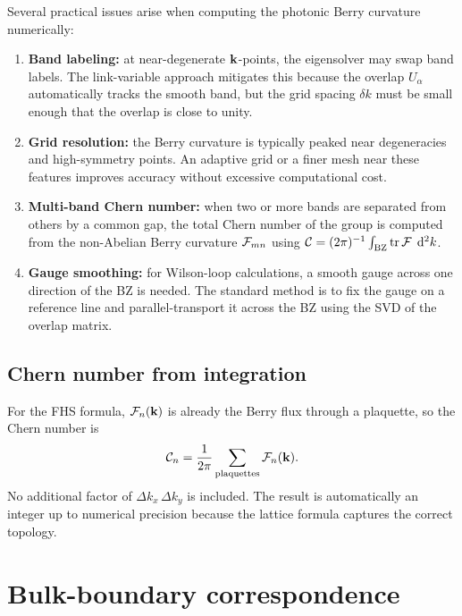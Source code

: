 Several practical issues arise when computing the photonic Berry
curvature numerically:
\begin{enumerate}
 \item \textbf{Band labeling:} at near-degenerate $\mathbf{k}$-points, the
 eigensolver may swap band labels. The link-variable approach
 mitigates this because the overlap $U_\alpha$ automatically tracks
 the smooth band, but the grid spacing $\delta k$ must be small
 enough that the overlap is close to unity.
 \item \textbf{Grid resolution:} the Berry curvature is typically
 peaked near degeneracies and high-symmetry points. An adaptive
 grid or a finer mesh near these features improves accuracy without
 excessive computational cost.
 \item \textbf{Multi-band Chern number:} when two or more bands are
 separated from others by a common gap, the total Chern number of
 the group is computed from the non-Abelian Berry curvature
 $\mathcal{F}_{mn}$ using
 $\mathcal{C} = (2\pi)^{-1}\int_{\mathrm{BZ}}\operatorname{tr}\mathcal{F}\;\mathop{}\!\mathrm{d}^2 k$.
 \item \textbf{Gauge smoothing:} for Wilson-loop calculations, a
 smooth gauge across one direction of the BZ is needed. The
 standard method is to fix the gauge on a reference line and
 parallel-transport it across the BZ using the SVD of the overlap
 matrix.
\end{enumerate}

\subsection{Chern number from integration}
\label{ssec:chern-numerical}

For the FHS formula, $\mathcal{F}_n(\mathbf{k})$ is already the Berry flux through a
plaquette, so the Chern number is
\begin{equation}
 \mathcal{C}_n = \frac{1}{2\pi}\sum_{\text{plaquettes}}\mathcal{F}_n(\mathbf{k}).
 \label{eq:fhs-chern-sum}
\end{equation}
No additional factor of $\Delta k_x\,\Delta k_y$ is included. The result
is automatically an integer up to numerical precision because the
lattice formula captures the correct topology.


\section{Bulk-boundary correspondence}
\label{sec:bbc-hermitian}

